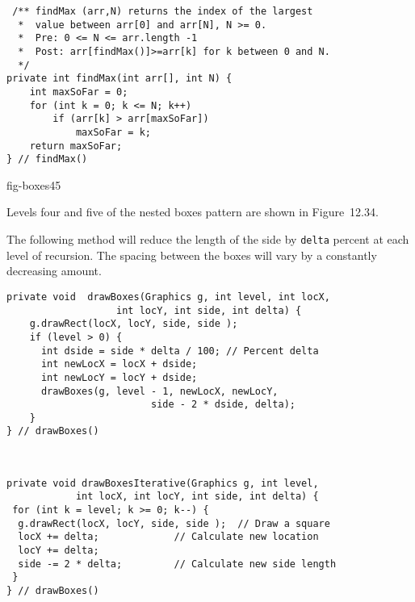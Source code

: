 \begin{ANS}
\begin{jjjlisting}
\begin{lstlisting}
 /** findMax (arr,N) returns the index of the largest
  *  value between arr[0] and arr[N], N >= 0.
  *  Pre: 0 <= N <= arr.length -1
  *  Post: arr[findMax()]>=arr[k] for k between 0 and N.
  */
private int findMax(int arr[], int N) {
    int maxSoFar = 0;
    for (int k = 0; k <= N; k++)
        if (arr[k] > arr[maxSoFar])
            maxSoFar = k;
    return maxSoFar;
} // findMax()
\end{lstlisting}
\end{jjjlisting}
{fig-boxes45}

\item  Levels four and five of the nested boxes  pattern
are shown in Figure~12.34.



\item  The following method will reduce the length of the side by {\tt delta}
percent at each level of recursion.  The spacing between the boxes
will vary by a constantly decreasing amount.

\begin{jjjlisting}
\begin{lstlisting}
private void  drawBoxes(Graphics g, int level, int locX, 
                   int locY, int side, int delta) {
    g.drawRect(locX, locY, side, side );
    if (level > 0) {
      int dside = side * delta / 100; // Percent delta
      int newLocX = locX + dside;
      int newLocY = locY + dside;
      drawBoxes(g, level - 1, newLocX, newLocY, 
                         side - 2 * dside, delta);
    }
} // drawBoxes()
\end{lstlisting}
\end{jjjlisting}

\item  \mbox{ }
\begin{jjjlisting}
\begin{lstlisting}
private void drawBoxesIterative(Graphics g, int level,  
            int locX, int locY, int side, int delta) {
 for (int k = level; k >= 0; k--) {
  g.drawRect(locX, locY, side, side );  // Draw a square
  locX += delta;             // Calculate new location
  locY += delta;
  side -= 2 * delta;         // Calculate new side length
 }
} // drawBoxes()
\end{lstlisting}
\end{jjjlisting}


\end{ANS}
